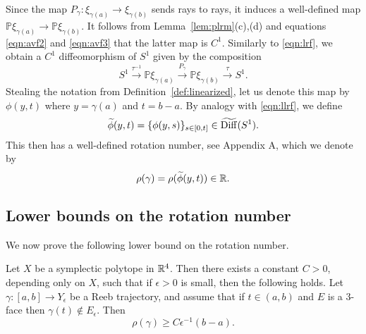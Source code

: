 Since the map $P_\gamma:\xi_{\gamma(a)}\to\xi_{\gamma(b)}$ sends rays to rays, it induces a well-defined map ${\mathbb P}\xi_{\gamma(a)}\to{\mathbb P}\xi_{\gamma(b)}$. It follows from Lemma~\ref{lem:plrm}(c),(d) and equations \eqref{eqn:avf2} and \eqref{eqn:avf3} that the latter map is $C^1$. Similarly to \eqref{eqn:lrf}, we obtain a $C^1$ diffeomorphism of $S^1$ given by the composition
\[
S^1\stackrel{\tau^{-1}}{\longrightarrow} {\mathbb P}\xi_{\gamma(a)} \stackrel{P_\gamma}{\longrightarrow} {\mathbb P}\xi_{\gamma(b)} \stackrel{\tau}{\longrightarrow} S^1. 
\]
Stealing the notation from Definition~\ref{def:linearized}, let us denote this map by $\phi(y,t)$ where $y=\gamma(a)$ and $t=b-a$. By analogy with \eqref{eqn:llrf}, we define
\[
\widetilde{\phi}(y,t) = \{\phi(y,s)\}_{s\in[0,t]}\in\widetilde{\operatorname{Diff}}(S^1).
\]
This then has a well-defined rotation number, see Appendix A, which we denote by
\[
\rho(\gamma) = \rho(\widetilde{\phi}(y,t))\in{\mathbb R}.
\]

\subsection{Lower bounds on the rotation number}
\label{sec:rnlb}

We now prove the following lower bound on the rotation number.

\begin{lemma}
\label{lem:rnlb1}
Let $X$ be a symplectic polytope in ${\mathbb R}^4$. Then there exists a constant $C>0$, depending only on $X$, such that if $\epsilon>0$ is small, then the following holds. Let $\gamma:[a,b]\to Y_\epsilon$ be a Reeb trajectory, and assume that if $t\in(a,b)$ and $E$ is a $3$-face then $\gamma(t)\notin E_\epsilon$. Then
\[
\rho(\gamma)\ge C\epsilon^{-1}(b-a).
\]
\end{lemma}

